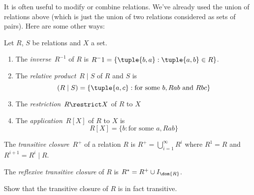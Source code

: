 \documentclass[../../include/open-logic-section]{subfiles}
\begin{document}

It is often useful to modify or combine relations. We've already used
the union of relations above (which is just the union of two relations
considered as sets of pairs). Here are some other ways:

\begin{defn} Let $R$, $S$ be relations and $X$ a set.
\begin{enumerate}
\item The \emph{inverse}~$R^{-1}$ of $R$ is $R^-1 = \{ \tuple{b, a} :
  \tuple{a, b} \in R\}$.
\item The \emph{relative product}~$R \mid S$ of $R$ and $S$ is 
\[
(R \mid S) = \{\tuple{a, c} : \text{for some } b, Rab \text{ and } Rbc\}
\]
\item The \emph{restriction}~$R \restrict X$ of $R$ to $X$
\item The \emph{application}~$R[X]$ of $R$ to $X$ is
\[
R[X] = \{b : \text{for some } a, Rab\}
\]
\end{enumerate}
\end{defn}

\begin{defn}
The \emph{transitive closure}~$R^+$ of a relation $R$ is $R^+ =
\bigcup_{i=1}^\infty R^i$ where $R^1 = R$ and $R^{i+1} = R^i \mid R$.

The \emph{reflexive transitive closure} of $R$ is $R^* = R^+ \cup
I_{\dom{R}}$.
\end{defn}

\begin{prob}
Show that the transitive closure of $R$ is in fact transitive.
\end{prob}
\end{document}
